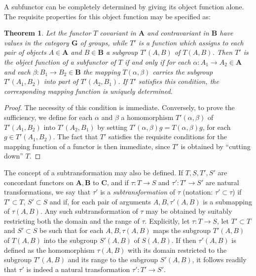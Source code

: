 \documentclass[11pt,a4paper]{report}
\newtheorem{theorem}{Theorem}
\begin{document}
A subfunctor can be completely determined by giving its object function alone. The requisite properties for this object function may
be specified as:
\begin{theorem}\label{thm:subfunc}
	Let the functor $T$ covariant in $\mathbf{A}$ and contravariant in $\mathbf{B}$ have values in the category $\mathbf{G}$
	of groups, while $T'$ is a function which assigns to each pair of objects $A\in\mathbf{A}$ and $B\in\mathbf{B}$ a subgroup
	$T'(A,B)$ of $T(A,B)$. Then $T'$ is the object function of a subfunctor of $T$ if and only if for each $\alpha:A_1\rightarrow
	A_2\in\mathbf{A}$ and each $\beta: B_1\rightarrow B_2\in\mathbf{B}$ the mapping $T(\alpha,\beta)$ carries the subgroup
	$T'(A_1,B_2)$ into part of $T'(A_2,B_1)$. If $T'$ satisfies this condition, the corresponding mapping function is uniquely
	determined.
\end{theorem}
\begin{proof}
	The necessity of this condition is immediate. Conversely, to prove the sufficiency, we define for each $\alpha$ and $\beta$ a
	homomorphism $T'(\alpha,\beta)$ of $T'(A_1,B_2)$ into $T'(A_2,B_1)$ by setting $T'(\alpha,\beta)g=T(\alpha,\beta)g$, for each
	$g\in T'(A_1,B_2)$. The fact that $T'$ satisfies the requisite conditions for the mapping function of a functor is then
	immediate, since $T'$ is obtained by ``cutting down'' $T$.
\end{proof}

The concept of a subtransformation may also be defined. If $T,S,T',S'$ are concordant functors on $\mathbf{A,B}$ to $\mathbf{C}$,
and if $\tau:T\rightarrow S$ and $\tau':T'\rightarrow S'$ are natural transformations, we say that $\tau'$ is a
\emph{subtransformation} of $\tau$ (notation: $\tau'\subset\tau$) if $T'\subset T$, $S'\subset S$ and if, for each pair of
arguments $A,B,\tau'(A,B)$ is a submapping of $\tau(A,B)$. Any such subtransformation of $\tau$ may be obtained by suitably
restricting both the domain and the range of $\tau$. Explicitly, let $\tau:T\rightarrow S$, let $T'\subset T$ and $S'\subset S$
be such that for each $A,B,\tau(A,B)$ maps the subgroup $T'(A,B)$ of $T(A,B)$ into the subgroup $S'(A,B)$ of $S(A,B)$.
If then $\tau'(A,B)$ is defined as the homomorphism $\tau(A,B)$ with its domain restricted to the subgroup $T'(A,B)$ and its
range to the subgroup $S'(A,B)$, it follows readily that $\tau'$ is indeed a natural transformation  $\tau':T'\rightarrow S'$.
\end{document}
